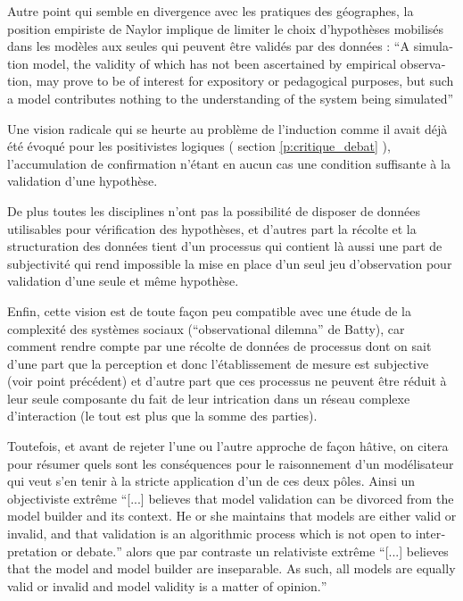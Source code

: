 Autre point qui semble en divergence avec les pratiques des géographes, la position empiriste de Naylor implique de limiter le choix d'hypothèses mobilisés dans les modèles aux seules qui peuvent être validés par des données : \foreignquote{english}{A simulation model, the validity of which has not been ascertained by empirical observation, may prove to be of interest for expository or pedagogical purposes, but such a model contributes nothing to the understanding of the system being simulated} \autocite{Naylor1967}

Une vision radicale qui se heurte au problème de l'induction comme il avait déjà été évoqué pour les positivistes logiques ( section \ref{p:critique_debat} ), l'accumulation de confirmation n'étant en aucun cas une condition suffisante à la validation d'une hypothèse.

De plus toutes les disciplines n'ont pas la possibilité de disposer de données utilisables pour vérification des hypothèses, et d'autres part la récolte et la structuration des données tient d'un processus qui contient là aussi une part de subjectivité qui rend impossible la mise en place d'un seul jeu d'observation pour validation d'une seule et même hypothèse.

Enfin, cette vision est de toute façon peu compatible avec une étude de la complexité des systèmes sociaux (\enquote{observational dilemna} de Batty), car comment rendre compte par une récolte de données de processus dont on sait d'une part que la perception et donc l'établissement de mesure est subjective (voir point précédent) et d'autre part que ces processus ne peuvent être réduit à leur seule composante du fait de leur intrication dans un réseau complexe d'interaction (le tout est plus que la somme des parties).



Toutefois, et avant de rejeter l'une ou l'autre approche de façon hâtive, on citera \textcite{Kleindorfer1998} pour résumer quels sont les conséquences pour le raisonnement d'un modélisateur qui veut s'en tenir à la stricte application d'un de ces deux pôles. Ainsi un objectiviste extrême \foreignquote{english}{[...] believes that model validation can be divorced from the model builder and its context. He or she maintains that models are either valid or invalid, and that validation is an algorithmic process which is not open to interpretation or debate.} alors que par contraste un relativiste extrême \foreignquote{english}{[...] believes that the model and model builder are inseparable. As such, all models are equally valid or invalid and model validity is a matter of opinion.}

